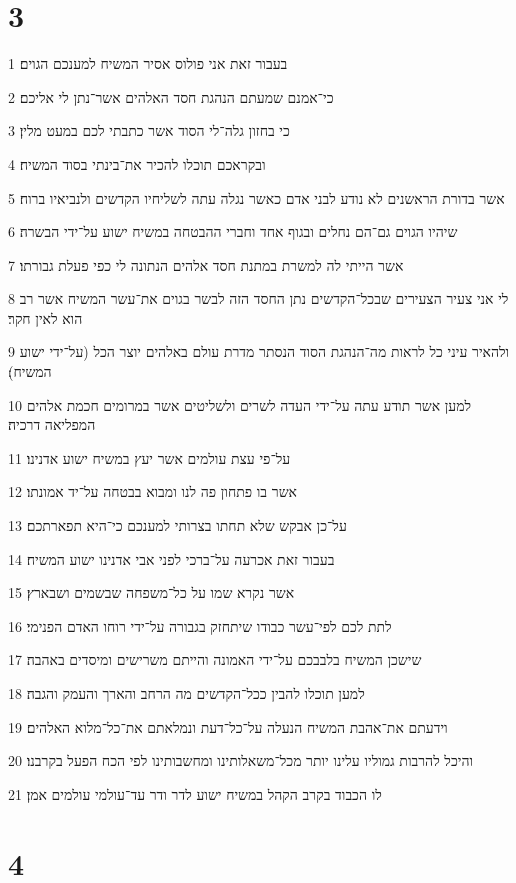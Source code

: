 \chapter{3}

\par 1 בעבור זאת אני פולוס אסיר המשיח למענכם הגוים׃
\par 2 כי־אמנם שמעתם הנהגת חסד האלהים אשר־נתן לי אליכם׃
\par 3 כי בחזון גלה־לי הסוד אשר כתבתי לכם במעט מלין׃
\par 4 ובקראכם תוכלו להכיר את־בינתי בסוד המשיח׃
\par 5 אשר בדורת הראשנים לא נודע לבני אדם כאשר נגלה עתה לשליחיו הקדשים ולנביאיו ברוח׃
\par 6 שיהיו הגוים גם־הם נחלים ובגוף אחד וחברי ההבטחה במשיח ישוע על־ידי הבשרה׃
\par 7 אשר הייתי לה למשרת במתנת חסד אלהים הנתונה לי כפי פעלת גבורתו׃
\par 8 לי אני צעיר הצעירים שבכל־הקדשים נתן החסד הזה לבשר בגוים את־עשר המשיח אשר רב הוא לאין חקר׃
\par 9 ולהאיר עיני כל לראות מה־הנהגת הסוד הנסתר מדרת עולם באלהים יוצר הכל (על־ידי ישוע המשיח)׃
\par 10 למען אשר תודע עתה על־ידי העדה לשרים ולשליטים אשר במרומים חכמת אלהים המפליאה דרכיה׃
\par 11 על־פי עצת עולמים אשר יעץ במשיח ישוע אדנינו׃
\par 12 אשר בו פתחון פה לנו ומבוא בבטחה על־יד אמונתו׃
\par 13 על־כן אבקש שלא תחתו בצרותי למענכם כי־היא תפארתכם׃
\par 14 בעבור זאת אכרעה על־ברכי לפני אבי אדנינו ישוע המשיח׃
\par 15 אשר נקרא שמו על כל־משפחה שבשמים ושבארץ׃
\par 16 לתת לכם לפי־עשר כבודו שיתחזק בגבורה על־ידי רוחו האדם הפנימי׃
\par 17 שישכן המשיח בלבבכם על־ידי האמונה והייתם משרישים ומיסדים באהבה׃
\par 18 למען תוכלו להבין ככל־הקדשים מה הרחב והארך והעמק והגבה׃
\par 19 וידעתם את־אהבת המשיח הנעלה על־כל־דעת ונמלאתם את־כל־מלוא האלהים׃
\par 20 והיכל להרבות גמוליו עלינו יותר מכל־משאלותינו ומחשבותינו לפי הכח הפעל בקרבנו׃
\par 21 לו הכבוד בקרב הקהל במשיח ישוע לדר ודר עד־עולמי עולמים אמן׃

\chapter{4}

